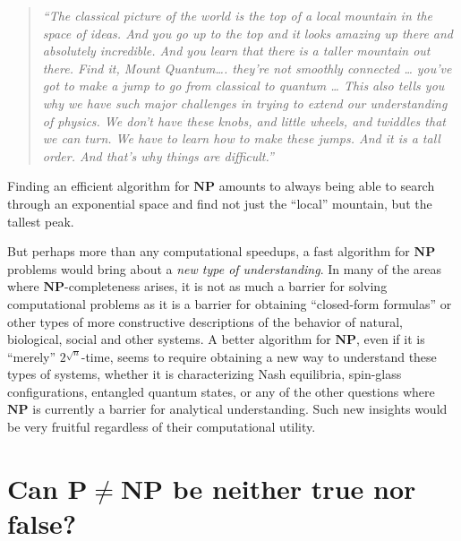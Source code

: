 \begin{quote}
\emph{``The classical picture of the world is the top of a local
mountain in the space of ideas. And you go up to the top and it looks
amazing up there and absolutely incredible. And you learn that there is
a taller mountain out there. Find it, Mount Quantum\ldots. they're not
smoothly connected \ldots{} you've got to make a jump to go from
classical to quantum \ldots{} This also tells you why we have such major
challenges in trying to extend our understanding of physics. We don't
have these knobs, and little wheels, and twiddles that we can turn. We
have to learn how to make these jumps. And it is a tall order. And
that's why things are difficult.''}
\end{quote}

Finding an efficient algorithm for \(\mathbf{NP}\) amounts to always
being able to search through an exponential space and find not just the
``local'' mountain, but the tallest peak.

But perhaps more than any computational speedups, a fast algorithm for
\(\mathbf{NP}\) problems would bring about a \emph{new type of
understanding}. In many of the areas where \(\mathbf{NP}\)-completeness
arises, it is not as much a barrier for solving computational problems
as it is a barrier for obtaining ``closed-form formulas'' or other types
of more constructive descriptions of the behavior of natural,
biological, social and other systems. A better algorithm for
\(\mathbf{NP}\), even if it is ``merely'' \(2^{\sqrt{n}}\)-time, seems
to require obtaining a new way to understand these types of systems,
whether it is characterizing Nash equilibria, spin-glass configurations,
entangled quantum states, or any of the other questions where
\(\mathbf{NP}\) is currently a barrier for analytical understanding.
Such new insights would be very fruitful regardless of their
computational utility.

\hypertarget{pnpconsequences}{}

\section{Can \(\mathbf{P} \neq \mathbf{NP}\) be neither true nor
false?}\label{Can-mathbfP-neq-mathbfNP-}

